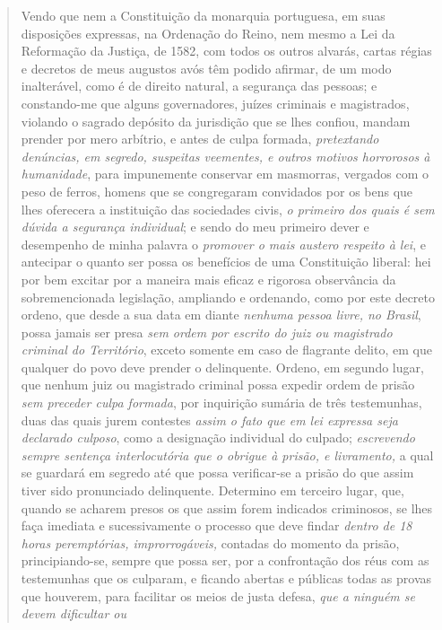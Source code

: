 \begin{quote}
Vendo que nem a Constituição da monarquia portuguesa, em suas
disposições expressas, na Ordenação do Reino, nem mesmo a Lei da
Reformação da Justiça, de 1582, com todos os outros alvarás, cartas
régias e decretos de meus augustos avós têm podido afirmar, de um modo
inalterável, como é de direito natural, a segurança das pessoas; e
constando-me que alguns governadores, juízes criminais e magistrados,
violando o sagrado depósito da jurisdição que se lhes confiou, mandam
prender por mero arbítrio, e antes de culpa formada, \emph{pretextando
denúncias, em segredo, suspeitas veementes, e outros motivos horrorosos
à humanidade}, para impunemente conservar em masmorras, vergados com o
peso de ferros, homens que se congregaram convidados por os bens que
lhes oferecera a instituição das sociedades civis, \emph{o primeiro dos
quais é sem dúvida a segurança individual}; e sendo do meu primeiro
dever e desempenho de minha palavra o \emph{promover o mais austero
respeito à lei}, e antecipar o quanto ser possa os benefícios de uma
Constituição liberal: hei por bem excitar por a maneira mais eficaz e
rigorosa observância da sobremencionada legislação, ampliando e
ordenando, como por este decreto ordeno, que desde a sua data em diante
\emph{nenhuma pessoa livre, no Brasil}, possa jamais ser presa \emph{sem
ordem por escrito do juiz ou magistrado criminal do Território}, exceto
somente em caso de flagrante delito, em que qualquer do povo deve
prender o delinquente. Ordeno, em segundo lugar, que nenhum juiz ou
magistrado criminal possa expedir ordem de prisão \emph{sem preceder
culpa formada}, por inquirição sumária de três testemunhas, duas das
quais jurem contestes \emph{assim o fato que em lei expressa seja
declarado culposo}, como a designação individual do culpado;
\emph{escrevendo sempre sentença interlocutória que o obrigue à prisão,
e livramento,} a qual se guardará em segredo até que possa verificar-se
a prisão do que assim tiver sido pronunciado delinquente. Determino em
terceiro lugar, que, quando se acharem presos os que assim forem
indicados criminosos, se lhes faça imediata e sucessivamente o processo
que deve findar \emph{dentro de 18 horas peremptórias, improrrogáveis,}
contadas do momento da prisão, principiando-se, sempre que possa ser,
por a confrontação dos réus com as testemunhas que os culparam, e
ficando abertas e públicas todas as provas que houverem, para facilitar
os meios de justa defesa, \emph{que a ninguém se devem dificultar ou
}
\end{quote}
